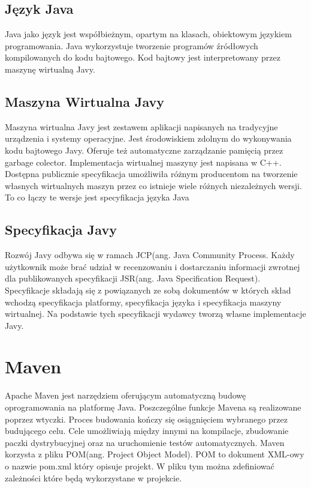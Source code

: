 \subsection{Język Java}
Java jako język jest współbieżnym, opartym na klasach, obiektowym językiem programowania. Java wykorzystuje tworzenie programów źródłowych kompilowanych do kodu bajtowego. Kod bajtowy jest interpretowany przez maszynę wirtualną Javy.

\subsection{Maszyna Wirtualna Javy}
Maszyna wirtualna Javy jest zestawem aplikacji napisanych na tradycyjne urządzenia i systemy operacyjne. Jest środowiskiem  zdolnym do wykonywania kodu bajtowego Javy. Oferuje też automatyczne zarządzanie pamięcią przez garbage colector. Implementacja wirtualnej maszyny jest napisana w C++. Dostępna publicznie specyfikacja umożliwiła różnym producentom na tworzenie własnych wirtualnych maszyn przez co istnieje wiele różnych niezależnych wersji. To co łączy te wersje jest specyfikacja języka Java

\subsection{Specyfikacja Javy}
Rozwój Javy odbywa się w ramach JCP(ang. Java Community Process. Każdy użytkownik może brać udział w recenzowaniu i dostarczaniu informacji zwrotnej dla publikowanych specyfikacji JSR(ang. Java Specification Request). Specyfikacje składają się z powiązanych ze sobą dokumentów w których skład wchodzą specyfikacja platformy, specyfikacja języka i specyfikacja maszyny wirtualnej. Na podstawie tych specyfikacji wydawcy tworzą własne implementacje Javy.

\section{Maven}
Apache Maven jest narzędziem oferującym automatyczną budowę oprogramowania na platformę Java. Poszczególne funkcje Mavena są realizowane poprzez wtyczki. Proces budowania kończy się osiągnięciem wybranego przez budującego celu. Cele umożliwiają między innymi na kompilacje, zbudowanie paczki dystrybucyjnej oraz na uruchomienie testów automatycznych. Maven korzysta z pliku POM(ang. Project Object Model). POM to dokument XML-owy o nazwie pom.xml który opisuje projekt. W pliku tym można zdefiniować zależności które będą wykorzystane w projekcie. 

